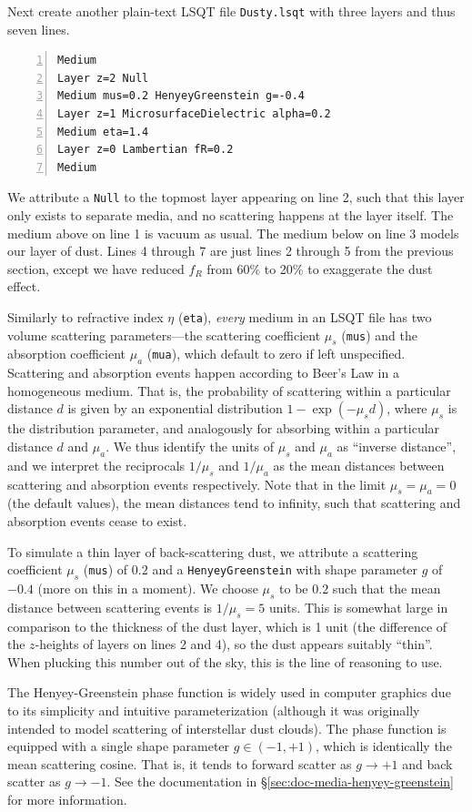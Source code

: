 \documentclass[
    twoside,
    twocolumn,
    letterpaper,
    10pt]{article}
\newcommand\namett[2]{{\color{code#1}\texttt{#2}}}
\begin{document}
Next create another plain-text LSQT file \texttt{Dusty.lsqt} with three 
layers and thus seven lines.
\begin{lstlisting}[numbers=left]
Medium
Layer z=2 Null
Medium mus=0.2 HenyeyGreenstein g=-0.4
Layer z=1 MicrosurfaceDielectric alpha=0.2
Medium eta=1.4
Layer z=0 Lambertian fR=0.2
Medium
\end{lstlisting}
We attribute a \namett{purple}{Null} to the topmost layer appearing
on line 2, such that this layer only exists to separate media, and 
no scattering happens at the layer itself. The medium above on line 1 
is vacuum as usual. The medium below on line 3 models our layer of dust.
Lines 4 through 7 are just lines 2 through 5 from the previous
section, except we have reduced $f_R$ from 60\% to 20\% to exaggerate
the dust effect.

Similarly to refractive index $\eta$ (\texttt{eta}), \emph{every} 
medium in an LSQT file has two volume scattering parameters---the 
scattering coefficient $\mu_s$ (\texttt{mus}) and the absorption 
coefficient $\mu_a$ (\texttt{mua}), which default to zero if 
left unspecified. Scattering and absorption events happen according
to Beer's Law in a homogeneous medium. That is, the probability of 
scattering within a particular distance $d$ is given by an exponential 
distribution $1 - \exp{(-\mu_s d)}$, where $\mu_s$ is the distribution 
parameter, and analogously for absorbing within a particular distance 
$d$ and $\mu_a$. We thus identify the units of $\mu_s$ and $\mu_a$ as 
``inverse distance'', and we interpret the reciprocals $1/\mu_s$ and 
$1/\mu_a$ as the mean distances between scattering and absorption events
respectively. Note that in the limit $\mu_s = \mu_a = 0$ (the default values),
the mean distances tend to infinity, such that scattering and absorption events
cease to exist.

To simulate a thin layer of back-scattering dust, 
we attribute a scattering coefficient $\mu_s$ (\texttt{mus}) of $0.2$ and 
a \namett{purple}{HenyeyGreenstein} with shape parameter $g$ of $-0.4$
(more on this in a moment). We choose $\mu_s$ to be $0.2$ such that the mean 
distance between scattering events is $1/\mu_s = 5$ units. This is somewhat 
large in comparison to the thickness of the dust layer, which is 1 unit 
(the difference of the $z$-heights of layers on lines 2 and 4), so the dust
appears suitably ``thin''. When plucking this number out of the sky, this is 
the line of reasoning to use. 

The Henyey-Greenstein phase function is widely used in computer graphics
due to its simplicity and intuitive parameterization (although it was 
originally intended to model scattering of interstellar dust clouds). The
phase function is equipped with a single shape parameter $g \in (-1, +1)$,
which is identically the mean scattering cosine. That is, it tends to
forward scatter as $g \to +1$ and back scatter as $g \to -1$. See the
documentation in \S\ref{sec:doc-media-henyey-greenstein} for more
information.
\end{document}

